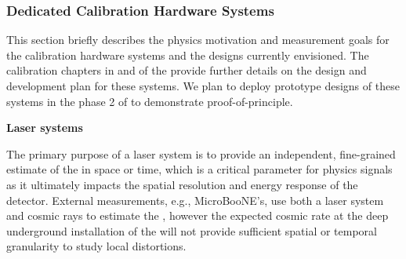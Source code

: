 \subsubsection{Dedicated Calibration Hardware Systems}
\label{sec:phys-calib-hardware}

This section briefly describes the physics motivation and measurement goals for the calibration hardware systems and the designs currently envisioned. The calibration chapters in \voltitlesp{} and \voltitledp{} of the  provide further details on the design and development plan for these systems. We plan to deploy prototype designs of these systems in 
the phase 2 of  to demonstrate proof-of-principle.

\textbf{Laser systems} 

The primary purpose of a laser system is to provide an independent, fine-grained estimate of the \efield in space or time, which is a critical parameter for physics signals as it ultimately impacts the spatial resolution and energy response of the detector. External measurements, e.g.,  MicroBooNE's, use both a laser system and cosmic rays to estimate the \efield, however the expected cosmic rate at the deep underground installation of the  will not provide sufficient spatial or temporal granularity to study local distortions.

